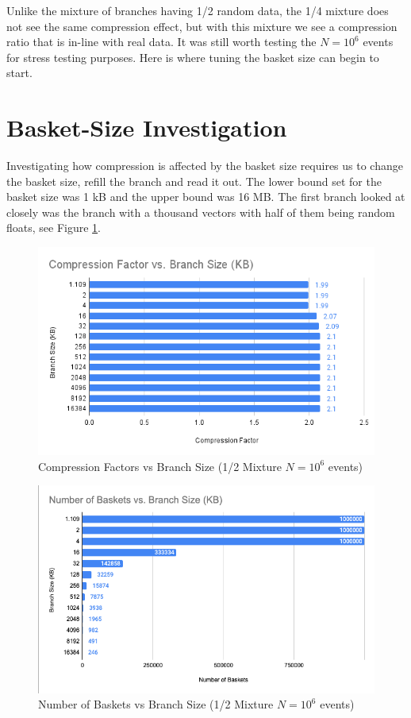 Unlike the mixture of branches having 1/2 random data, the 1/4 mixture does not see the same compression effect, but with this mixture we see a compression ratio that is in-line with real data.
It was still worth testing the $N=10^6$ events for stress testing purposes.
Here is where tuning the basket size can begin to start.

\section{Basket-Size Investigation}

Investigating how compression is affected by the basket size requires us to change the basket size, refill the branch and read it out.
The lower bound set for the basket size was 1 kB and the upper bound was 16 MB.
The first branch looked at closely was the branch with a thousand vectors with half of them being random floats, see Figure \ref{fig:toymodel_CFvsBranchSize_1/2mixture}.

\begin{figure}[h]
    \centering
    \includegraphics[width=.8\textwidth]{content/toymodel_content/Compression Factor vs. Branch Size (KB).png}
    \caption{Compression Factors vs Branch Size (1/2 Mixture $N=10^6$ events)}
    \label{fig:toymodel_CFvsBranchSize_1/2mixture}
\end{figure}

\begin{figure}[h]
    \centering
    \includegraphics[width=.8\textwidth]{content/toymodel_content/Number of Baskets vs Branch Size.png}
    \caption{Number of Baskets vs Branch Size (1/2 Mixture $N=10^6$ events)}
    \label{fig:toymodel_NumBasketsvsBranchSize_1/2mixture}
\end{figure}

